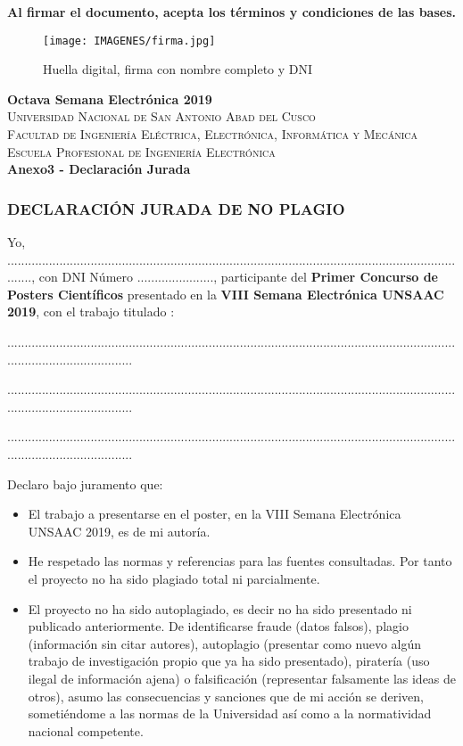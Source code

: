 \documentclass{article}
\begin{document}
\textbf{Al firmar el documento, acepta los términos y condiciones de las bases.}

\begin{figure}[hbtp]
\centering
\texttt{[image: IMAGENES/firma.jpg]}
\caption{Huella digital, firma con nombre completo y DNI}
\end{figure}

\newpage
{\center
{\Huge \bfseries Octava Semana Electrónica 2019} \\ [0.4cm]
\textsc{\LARGE  Universidad Nacional de San Antonio Abad del Cusco}\\[0.4cm] 
\textsc{\Large Facultad de Ingeniería Eléctrica, Electrónica, Informática y Mecánica}\\[0.4cm] 
\textsc{\large Escuela Profesional de Ingeniería Electrónica}\\[0.4cm]
{ \bfseries Anexo3 - Declaración Jurada}}

\subsubsection{DECLARACIÓN JURADA DE NO PLAGIO}

Yo, ........................................................................................................................................, con DNI Número 
......................, participante del \textbf{Primer Concurso de Posters Científicos} presentado en la \textbf{VIII Semana Electrónica UNSAAC 2019}, con el trabajo titulado :

.....................................................................................................................................................................

.....................................................................................................................................................................

.....................................................................................................................................................................


Declaro bajo juramento que: 

\begin{itemize}
\item El trabajo a presentarse en el poster, en la VIII Semana Electrónica UNSAAC 2019, es de mi autoría. 
\item He respetado las normas y referencias para las fuentes consultadas. Por tanto el proyecto no ha sido 
plagiado total ni parcialmente. 
\item El proyecto no ha sido autoplagiado, es decir no ha sido presentado ni publicado anteriormente. De 
identificarse fraude (datos falsos), plagio (información sin citar autores), autoplagio (presentar como 
nuevo algún trabajo de investigación propio que ya ha sido presentado), piratería (uso ilegal de 
información ajena) o falsificación (representar falsamente las ideas de otros), asumo las consecuencias 
y sanciones que de mi acción se deriven, sometiéndome a las normas de la Universidad así como a la 
normatividad nacional competente.
\end{itemize}
\end{document}

